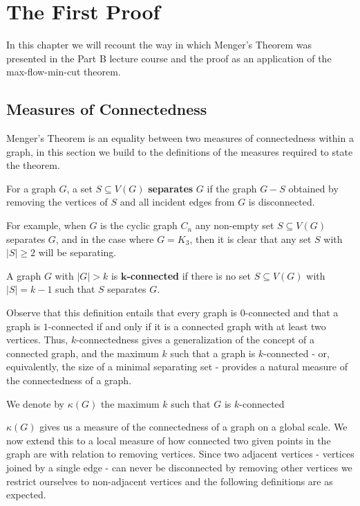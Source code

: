 \chapter{The First Proof}

In this chapter we will recount the way in which Menger's Theorem was presented in the Part B lecture course and the proof as an application of the max-flow-min-cut theorem.

\section{Measures of Connectedness}

Menger's Theorem is an equality between two measures of connectedness within a graph, in this section we build to the definitions of the measures required to state the theorem.

\begin{defn}
For a graph $G$, a set $S \subseteq V(G)$ \textbf{separates} $G$ if the graph $G-S$ obtained by removing the vertices of $S$ and all incident edges from $G$ is disconnected.
\end{defn}

For example, when $G$ is the cyclic graph $C_n$ any non-empty set $S \subseteq V(G)$ separates $G$, and in the case where $G = K_3$, then it is clear that any set $S$ with $|S| \geq 2$ will be separating.

\begin{defn}
A graph $G$ with $|G| > k$ is $\boldsymbol{k}$\textbf{-connected} if there is no set $S \subseteq V(G)$ with $|S| = k - 1$ such that $S$ separates $G$.
\end{defn}

Observe that this definition entails that every graph is $0$-connected and that a graph is $1$-connected if and only if it is a connected graph with at least two vertices. Thus, $k$-connectedness gives a generalization of the concept of a connected graph, and the maximum $k$ such that a graph is $k$-connected - or, equivalently, the size of a minimal separating set - provides a natural measure of the connectedness of a graph. 

\begin{notat}
We denote by $\kappa(G)$ the maximum $k$ such that $G$ is $k$-connected
\end{notat}

$\kappa(G)$ gives us a measure of the connectedness of a graph on a global scale. We now extend this to a local measure of how connected two given points in the graph are with relation to removing vertices. Since two adjacent vertices - vertices joined by a single edge - can never be disconnected by removing other vertices we restrict ourselves to non-adjacent vertices and the following definitions are as expected.

